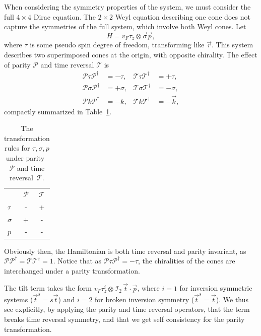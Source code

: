 When considering the symmetry properties of the system, we must consider the full \( 4\times 4 \) Dirac equation.
The \( 2\times 2 \) Weyl equation describing one cone does not capture the symmetries of the full system, which involve both Weyl cones.
Let
\[
  H = v_{F} \tau _{z} \otimes \vec{\sigma} \vec{p},
\]
where \(\tau \) is some pseudo spin degree of freedom, transforming like \(\vec{r}\).
This system describes two superimposed cones at the origin, with opposite chirality.
The effect of parity \(\mathcal{P}\) and time reversal \(\mathcal{T}\) is
\begin{equation}
  \label{eq:135}
  \begin{aligned}
    \mathcal{P} \tau \mathcal{P}^{\dagger} &= -\tau, & \mathcal{T} \tau \mathcal{T}^{\dagger} &= +\tau,\\
    \mathcal{P} \sigma  \mathcal{P}^{\dagger} &= + \sigma,  & \mathcal{T} \sigma  \mathcal{T}^{\dagger} &= -\sigma, \\
    \mathcal{P} k \mathcal{P}^{\dagger} &= -k, & \mathcal{T} k \mathcal{T}^{\dagger} &= -\vec{k},
  \end{aligned}
\end{equation}
compactly summarized in Table~\ref{tab:sign-transform}.
\begin{table}[h]
  \centering
  \begin{tabular}{lcc}
    \toprule
    & \(\mathcal{P}\) & \(\mathcal{T}\)\\
    \cmidrule{2-3}
    \(\tau \) & - & +\\
    \(\sigma \) & + & -\\
    \(p\) & - & -\\
    \bottomrule
  \end{tabular}
  \caption{The transformation rules for \( \tau, \sigma, p \) under parity~\( \mathcal{P} \) and time reversal~\( \mathcal{T} \).
   \label{tab:sign-transform}
  }
\end{table}
Obviously then, the Hamiltonian is both time reversal and parity invariant, as \(\mathcal{P} \mathcal{P}^{\dagger} = \mathcal{T} \mathcal{T}^{\dagger} = 1\).
Notice that as \( \mathcal{P} \tau \mathcal{P}^{\dagger} = - \tau \), the chiralities of the cones are interchanged under a parity transformation.

The tilt term takes the form \(v_F \tau_z^i \otimes \mathcal{I}_{2} \, \vec{t} \cdot \vec{p} \), where \( i=1 \) for inversion symmetric systems (\( \vec{t}^s = s \vec{t} \)) and \( i=2 \) for broken inversion symmetry (\( \vec{t}^s = \vec{t} \)).
We thus see explicitly, by applying the parity and time reversal operators, that the term breaks time reversal symmetry, and that we get self consistency for the parity transformation.

